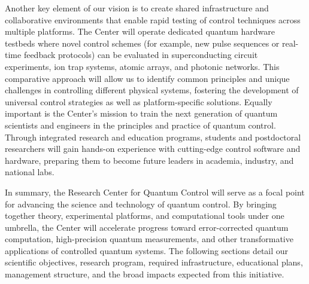 \documentclass[11pt]{article}
\begin{document}
Another key element of our vision is to create shared infrastructure and collaborative environments that enable rapid testing of control techniques across multiple platforms. The Center will operate dedicated quantum hardware testbeds where novel control schemes (for example, new pulse sequences or real-time feedback protocols) can be evaluated in superconducting circuit experiments, ion trap systems, atomic arrays, and photonic networks. This comparative approach will allow us to identify common principles and unique challenges in controlling different physical systems, fostering the development of universal control strategies as well as platform-specific solutions. Equally important is the Center's mission to train the next generation of quantum scientists and engineers in the principles and practice of quantum control. Through integrated research and education programs, students and postdoctoral researchers will gain hands-on experience with cutting-edge control software and hardware, preparing them to become future leaders in academia, industry, and national labs.

In summary, the Research Center for Quantum Control will serve as a focal point for advancing the science and technology of quantum control. By bringing together theory, experimental platforms, and computational tools under one umbrella, the Center will accelerate progress toward error-corrected quantum computation, high-precision quantum measurements, and other transformative applications of controlled quantum systems. The following sections detail our scientific objectives, research program, required infrastructure, educational plans, management structure, and the broad impacts expected from this initiative.
\end{document}
